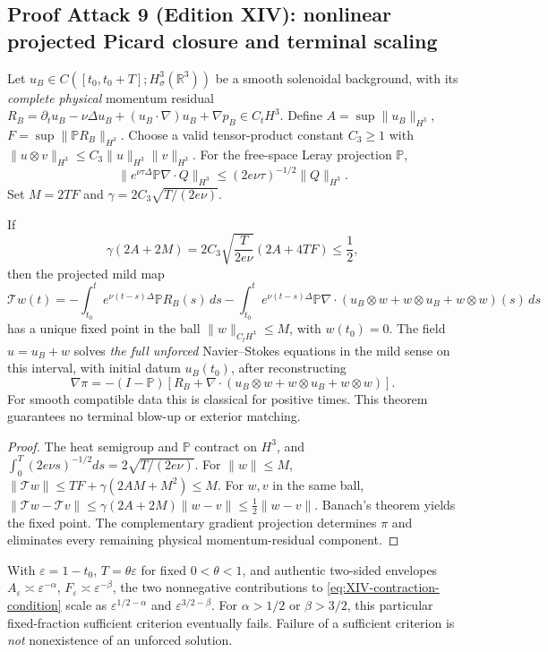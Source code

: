 \subsection*{Proof Attack 9 (Edition XIV): nonlinear projected Picard closure and terminal scaling}
\label{subsec:n1-XIV-picard}
Let $u_B\in C([t_0,t_0+T];H^3_\sigma(\mathbb R^3))$ be a
smooth solenoidal background, with its \emph{complete physical}
momentum residual $R_B=\partial_tu_B-\nu\Delta u_B+
(u_B\cdot\nabla)u_B+\nabla p_B\in C_tH^3$.
Define
$A=\sup\|u_B\|_{H^3}$, $F=\sup\|\mathbb PR_B\|_{H^3}$.
Choose a valid tensor-product constant $C_3\ge1$ with
$\|u\otimes v\|_{H^3}\le C_3\|u\|_{H^3}\|v\|_{H^3}$.
For the free-space Leray projection $\mathbb P$,
\[
\|e^{\nu\tau\Delta}\mathbb P\nabla\cdot Q\|_{H^3}
\le(2e\nu\tau)^{-1/2}\|Q\|_{H^3}.
\]
Set $M=2TF$ and $\gamma=2C_3\sqrt{T/(2e\nu)}$.
\begin{theorem}
If
\begin{equation}\label{eq:XIV-contraction-condition}
\boxed{\gamma(2A+2M)=
2C_3\sqrt{\frac{T}{2e\nu}}(2A+4TF)\le\frac12,}
\end{equation}
then the projected mild map
\[
\mathcal Tw(t)=
-\int_{t_0}^te^{\nu(t-s)\Delta}\mathbb P R_B(s)\,ds
-\int_{t_0}^te^{\nu(t-s)\Delta}\mathbb P\nabla\cdot
(u_B\otimes w+w\otimes u_B+w\otimes w)(s)\,ds
\]
has a unique fixed point in the ball
$\|w\|_{C_tH^3}\le M$, with $w(t_0)=0$.
The field $u=u_B+w$ solves \emph{the full unforced}
Navier--Stokes equations in the mild sense on this interval,
with initial datum $u_B(t_0)$, after reconstructing
\[
\nabla\pi=-(I-\mathbb P)
[R_B+\nabla\cdot(u_B\otimes w+w\otimes u_B+w\otimes w)].
\]
For smooth compatible data this is classical for positive times.
This theorem guarantees no terminal blow-up or exterior matching.
\end{theorem}
\begin{proof}
The heat semigroup and $\mathbb P$ contract on $H^3$, and
$\int_0^T(2e\nu s)^{-1/2}ds=2\sqrt{T/(2e\nu)}$.
For $\|w\|\le M$,
$\|\mathcal Tw\|\le TF+\gamma(2AM+M^2)\le M$.
For $w,v$ in the same ball,
$\|\mathcal Tw-\mathcal Tv\|
\le\gamma(2A+2M)\|w-v\|\le\frac12\|w-v\|$.
Banach's theorem yields the fixed point. The complementary
gradient projection determines $\pi$ and eliminates every
remaining physical momentum-residual component.
\end{proof}
\begin{proposition}
With $\varepsilon=1-t_0$, $T=\theta\varepsilon$
for fixed $0<\theta<1$, and authentic two-sided envelopes
$A_\varepsilon\asymp\varepsilon^{-\alpha}$,
$F_\varepsilon\asymp\varepsilon^{-\beta}$, the two
nonnegative contributions to \eqref{eq:XIV-contraction-condition}
scale as $\varepsilon^{1/2-\alpha}$ and
$\varepsilon^{3/2-\beta}$. For $\alpha>1/2$ or
$\beta>3/2$, this particular fixed-fraction sufficient
criterion eventually fails. Failure of a sufficient criterion
is \emph{not} nonexistence of an unforced solution.
\end{proposition}
